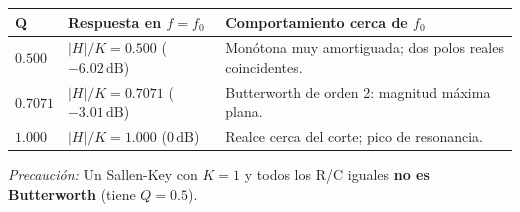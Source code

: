 \documentclass[10pt, a4paper]{article}
\begin{document}
\begin{table}[htbp]
    \centering
    \footnotesize
    \renewcommand{\arraystretch}{1.3}
    \begin{tabularx}{\textwidth}{|P{1.2cm}|P{3.5cm}|Y|}
    \hline
    \textbf{Q} & \textbf{Respuesta en $f=f_0$} & \textbf{Comportamiento cerca de $f_0$} \\ \hline
    $0.500$ & $|H|/K = 0.500$ ($-6.02\,\mathrm{dB}$) & Monótona muy amortiguada; dos polos reales coincidentes. \\ \hline
    $0.7071$ & $|H|/K = 0.7071$ ($-3.01\,\mathrm{dB}$) & Butterworth de orden 2: magnitud máxima plana. \\ \hline
    $1.000$ & $|H|/K = 1.000$ ($0\,\mathrm{dB}$) & Realce cerca del corte; pico de resonancia. \\ \hline
    \end{tabularx}
\end{table}
\textit{Precaución:} Un Sallen-Key con $K=1$ y todos los R/C iguales \textbf{no es Butterworth} (tiene $Q=0.5$).
\end{document}
